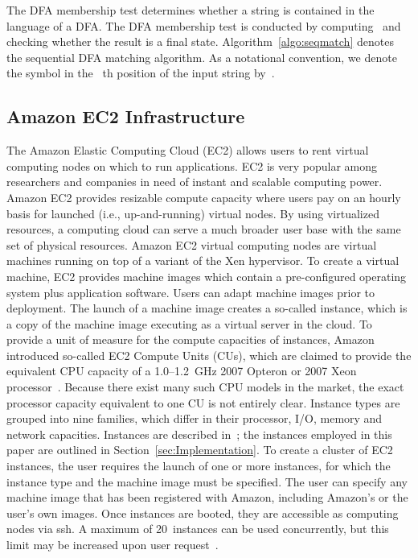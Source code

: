 \documentclass[smallextended]{svjour3}
\begin{document}
The DFA membership test determines whether a string is 
contained in the language of a DFA.
The DFA membership test is conducted by
computing~ and checking whether the result 
is a final state. Algorithm~\ref{algo:seqmatch} denotes the
sequential DFA matching algorithm.
As a notational convention, we denote the symbol
in the ~th position of the input string by~.

\subsection{Amazon EC2 Infrastructure\label{sec:ec2background}}
The Amazon Elastic Computing Cloud (EC2) allows users to rent virtual
computing nodes on which to run applications. EC2 is very popular
among researchers and companies in need of instant and scalable computing
power. Amazon EC2 provides resizable compute capacity where users 
pay on an hourly basis for launched (i.e., up-and-running) virtual nodes.
By using virtualized resources, a computing cloud can serve a much broader
user base with the same set of physical resources.
Amazon EC2 virtual computing
nodes are virtual machines running on top of a 
variant of the Xen hypervisor.
To create a virtual machine, EC2 provides machine images which contain
a pre-configured
operating system plus application software. Users can adapt
machine images prior to deployment. The launch of a machine
image creates a so-called instance, which is a copy of the machine
image executing as a  virtual server in the cloud.
To provide a unit of measure for the compute capacities of instances,
Amazon introduced so-called EC2 Compute Units (CUs), which are claimed
to provide the equivalent CPU capacity of a 1.0--1.2~GHz 2007 Opteron or
2007 Xeon processor~\cite{EC2}. Because there exist many such CPU models
in the market, the exact processor capacity equivalent to one CU is not
entirely clear. Instance types are grouped into nine families, which
differ in their processor, I/O, memory and network capacities.
Instances are described in~\cite{EC2}; the instances employed in this
paper are outlined in Section~\ref{sec:Implementation}.
To create a cluster of EC2 instances, the user requires the launch of
one or more instances, for which the instance type and the machine image
must be specified.
The user can specify any machine image that has been registered with Amazon,
including Amazon's or the user's own images.
Once instances are booted, they are accessible
as computing nodes via ssh. A maximum of 20~instances can be used
concurrently, but this limit may be increased upon
user request~\cite{EC2limit}.  
\end{document}
